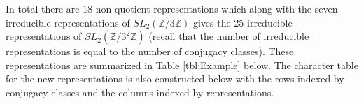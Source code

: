 \documentclass[12pt,reqno]{amsart}
\theoremstyle{remark}
\numberwithin{table}{section}
\newcommand{\Z}{\mathbb Z}
\renewcommand{\arraystretch}{1.5}
\begin{document}
In total there are 18 non-quotient representations which along  with the seven irreducible representations of $SL_2(\Z/3\Z)$ gives the  25 irreducible representations of $SL_2(\Z/3^2 \Z)$ (recall that the number of irreducible representations is equal to the number of conjugacy classes). These representations are summarized in Table \ref{tbl:Example} below. The character table for the new representations is also constructed below with the rows indexed by conjugacy classes and the columns indexed by representations. 
\end{document}
